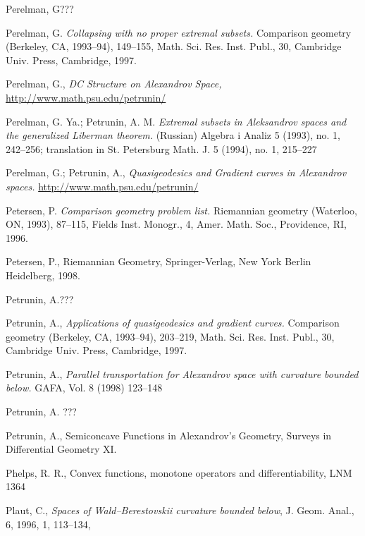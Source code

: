 \begin{thebibliography}{52}
Perelman, G???

 Perelman, G. \textit{Collapsing with no proper extremal subsets.}  Comparison geometry (Berkeley, CA, 1993--94),  149--155,
Math. Sci. Res. Inst. Publ., 30, Cambridge Univ. Press, Cambridge, 1997.


 Perelman, G., \textit{DC Structure on Alexandrov Space,}\\ \href{http://www.math.psu.edu/petrunin/papers/papers.html}{http://www.math.psu.edu/petrunin/}

 Perelman, G. Ya.; Petrunin, A. M.
\textit{Extremal subsets in Aleksandrov spaces and the generalized Liberman theorem.}
(Russian)  Algebra i Analiz  5  (1993),  no. 1, 242--256;  translation in  St.
Petersburg Math. J.  5  (1994),  no. 1, 215--227

 Perelman, G.; Petrunin,  A., \textit{Quasigeodesics and Gradient curves in Alexandrov spaces.}
 \href{http://www.math.psu.edu/petrunin/papers/papers.html}{http://www.math.psu.edu/petrunin/}

 Petersen, P. \textit{Comparison geometry problem list.} Riemannian geometry (Waterloo, ON, 1993), 87--115,
Fields Inst. Monogr., 4, Amer. Math. Soc., Providence, RI, 1996. 

 Petersen, P., Riemannian Geometry,
Springer-Verlag, New York Berlin Heidelberg, 1998.

Petrunin, A.???

 Petrunin, A., \textit{Applications of quasigeodesics
and gradient curves.}  Comparison geometry (Berkeley, CA, 1993--94),  203--219,
Math. Sci. Res. Inst. Publ., 30, Cambridge Univ. Press, Cambridge, 1997.

 Petrunin, A., \textit{Parallel transportation for Alexandrov space with curvature bounded below.}  GAFA, Vol. 8 (1998) 123--148

 Petrunin, A. ???

 Petrunin, A.,  Semiconcave Functions in Alexandrov's Geometry, Surveys in Differential Geometry XI.

Phelps, R. R., Convex functions, monotone operators and differentiability, LNM 1364

 {Plaut, C.},
      \textit{{Spaces of Wald--Berestovskii curvature bounded below}},
    {J. Geom. Anal.},
     {6},
     {1996},
     {1},
      {113--134},


\end{thebibliography}
